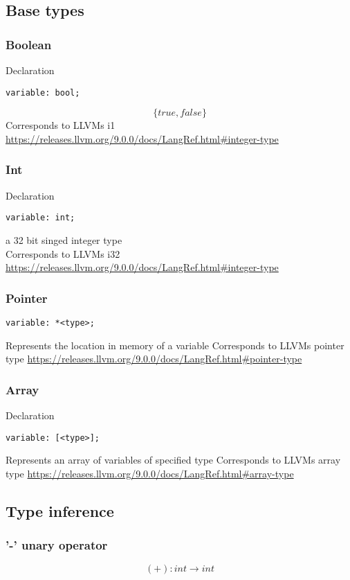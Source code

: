 \documentclass{article}
\begin{document}
\subsection{Base types}
\subsubsection{Boolean}
Declaration 
\begin{verbatim}
variable: bool;
\end{verbatim}
$$
\{true, false\}
$$
Corresponds to LLVMs i1 \url{https://releases.llvm.org/9.0.0/docs/LangRef.html#integer-type}
\subsubsection{Int}
Declaration 
\begin{verbatim}
variable: int;
\end{verbatim}

a 32 bit singed integer type \\
Corresponds to LLVMs i32 \url{https://releases.llvm.org/9.0.0/docs/LangRef.html#integer-type}
\subsubsection{Pointer}
\begin{verbatim}
variable: *<type>;
\end{verbatim}
Represents the location in memory of a variable
Corresponds to LLVMs pointer type \url{https://releases.llvm.org/9.0.0/docs/LangRef.html#pointer-type}
\subsubsection{Array}
Declaration 
\begin{verbatim}
variable: [<type>];
\end{verbatim}
Represents an array of variables of specified type
Corresponds to LLVMs array type \url{https://releases.llvm.org/9.0.0/docs/LangRef.html#array-type}

\subsection{Type inference}


\subsubsection{'-' unary operator}
$$
(+): int \longrightarrow int
$$
\end{document}
